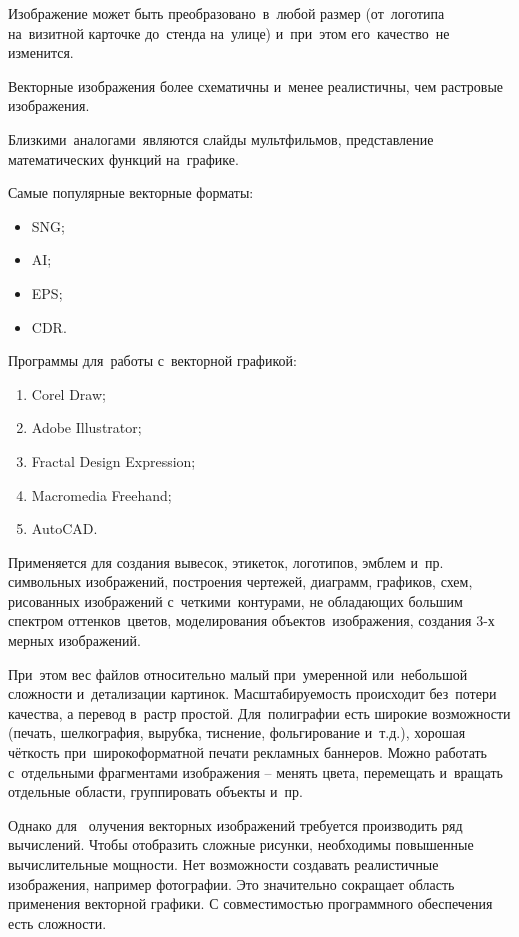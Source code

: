 \documentclass{ou}
\begin{document}
Изображение может быть преобразовано~в~любой размер (от~логотипа на~визитной карточке до~стенда на~улице) и~при~этом его~качество~не изменится.

Векторные изображения более схематичны и~менее реалистичны, чем растровые изображения.

Близкими~аналогами~являются слайды мультфильмов, представление математических функций на~графике.

Самые популярные векторные форматы:
\begin{itemize}[label=-, itemindent=2em, nosep]
\item SNG;
\item AI;
\item EPS;
\item CDR.
\end{itemize}

Программы для~работы с~векторной графикой:
\begin{enumerate}[itemindent=2em, nosep, label=\arabic*)]
\item Corel Draw;
\item Adobe Illustrator;
\item Fractal Design Expression;
\item Macromedia Freehand;
\item AutoCAD.
\end{enumerate}

Применяется для создания вывесок, этикеток, логотипов, эмблем и~пр. символьных изображений, построения чертежей, диаграмм, графиков, схем, рисованных изображений с~четкими~контурами, не обладающих большим спектром оттенков~цветов, моделирования объектов~изображения, создания 3-х мерных изображений.

При~этом вес файлов относительно малый при~умеренной или~небольшой сложности и~детализации картинок. Масштабируемость происходит без~потери качества, а перевод в~растр простой. Для~полиграфии есть широкие возможности (печать, шелкография, вырубка, тиснение, фольгирование и~т.д.), хорошая чёткость при~широкоформатной печати рекламных баннеров. Можно работать с~отдельными фрагментами изображения -- менять цвета, перемещать и~вращать отдельные области, группировать объекты и~пр.

Однако для~ олучения векторных изображений требуется производить ряд вычислений. Чтобы отобразить сложные рисунки, необходимы повышенные вычислительные мощности. Нет возможности создавать реалистичные изображения, например фотографии. Это значительно сокращает область применения векторной графики. С совместимостью программного обеспечения есть сложности.
\end{document}
